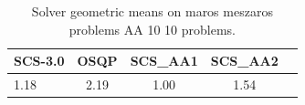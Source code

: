 \begin{table}
\centering
\caption{Solver geometric means on maros meszaros problems AA 10 10 problems.}
\label{t-maros meszaros problems AA 10 10-geom_mean}
\begin{tabular}{lcccc}
\toprule
 SCS-3.0 &  OSQP &  SCS\_AA1 &  SCS\_AA2 \\
\midrule
    1.18 &  2.19 &     1.00 &     1.54 \\
\bottomrule
\end{tabular}
\end{table}
